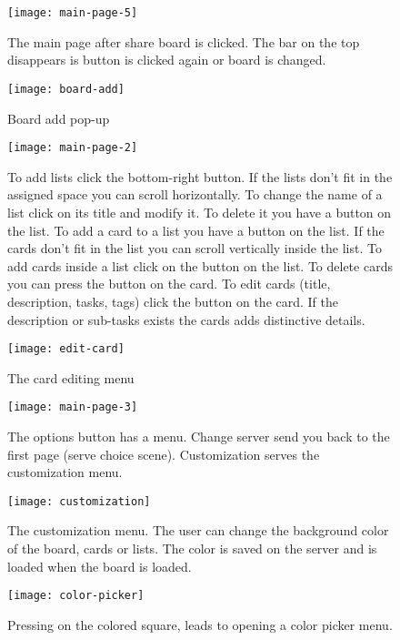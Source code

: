 \begin{figure}[H]
\caption{The main page after share board is clicked. The bar on the top disappears is button is clicked again or board is changed.}
\centering
\texttt{[image: main-page-5]}
\end{figure}

\begin{figure}[H]
\caption{Board add pop-up}
\centering
\texttt{[image: board-add]}
\end{figure}

\begin{figure}[H]
\caption{To add lists click the bottom-right button. If the lists don’t fit in the assigned space you can scroll horizontally. To change the name of a list click on its title and modify it. To delete it you have a button on the list. To add a card to a list you have a button on the list. If the cards don’t fit in the list you can scroll vertically inside the list. To add cards inside a list click on the button on the list. To delete cards you can press the button on the card. To edit cards (title, description, tasks, tags) click the button on the card. If the description or sub-tasks exists the cards adds distinctive details.}
\centering
\texttt{[image: main-page-2]}
\end{figure}

\begin{figure}[H]
\caption{The card editing menu}
\centering
\texttt{[image: edit-card]}
\end{figure}

\begin{figure}[H]
\caption{The options button has a menu. Change server send you back to the first page (serve choice scene). Customization serves the customization menu. }
\centering
\texttt{[image: main-page-3]}
\end{figure}

\begin{figure}[H]
\caption{The customization menu. The user can change the background color of the board, cards or lists. The color is saved on the server and is loaded when the board is loaded.}
\centering
\texttt{[image: customization]}
\end{figure}

\begin{figure}[H]
\caption{Pressing on the colored square, leads to opening a color picker menu.}
\centering
\texttt{[image: color-picker]}
\end{figure}

